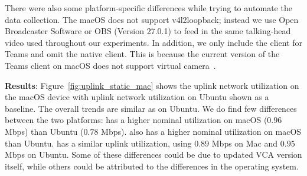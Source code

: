 There were also some platform-specific differences while trying to automate the data collection. The macOS does not support v4l2loopback; instead we use Open Broadcaster Software or OBS (Version 27.0.1) to feed in the same
talking-head video used throughout our experiments. In addition, we only include the \teamsbrowser client for Teams and omit the native client. This is because the current version of the Teams client on macOS does not support virtual camera~\cite{teams_virtual_camera}. 

\textbf{Results}: 
Figure~\ref{fig:uplink_static_mac} shows the uplink network utilization on the macOS device with uplink network utilization on Ubuntu shown as a baseline. The overall trends are similar as on Ubuntu. We do find few differences between the two platforms: %
\zoom has a higher nominal utilization on macOS ($0.96$ Mbps) than Ubuntu ($0.78$ Mbps). \teamsbrowser also has a higher
nominal utilization on macOS than Ubuntu. \meet has a 
similar uplink utilization, using $0.89$ Mbps on Mac and $0.95$ Mbps on Ubuntu. Some of these differences could be due to updated VCA version itself, while others could be attributed to the differences in the operating system. 


